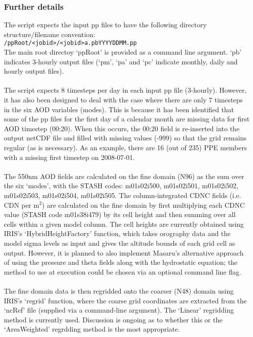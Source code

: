 \documentclass[10pt,a4paper]{article}
\newcommand\tab[1][0.5cm]{\hspace*{#1}}
\begin{document}
\subsubsection{Further details}
The script expects the input pp files to have the following directory structure/filename convention:\\
\tab \texttt{/ppRoot/<jobid>/<jobid>a.pbYYYYDDMM.pp}\\
The main root directoy `ppRoot' is provided as a command line argument. `pb' indicates 3-hourly output files (`pm', `pa' and `pc' indicate monthly, daily and hourly output files).\\\\
The script expects 8 timesteps per day in each input pp file (3-hourly). However, it has also been designed to deal with the case where there are only 7 timesteps in the six AOD variables (modes). This is because it has been identified that some of the pp files for the first day of a calendar month are missing data for first AOD timestep (00:20). When this occurs, the 00:20 field is re-inserted into the output netCDF file and filled with missing values (-999) so that the grid remains regular (as is necessary). As an example, there are 16 (out of 235) PPE members with a missing first timestep on 2008-07-01.\\\\
The 550nm AOD fields are calculated on the fine domain (N96) as the sum over the six `modes', with the STASH codes: m01s02i500, m01s02i501, m01s02i502, m01s02i503, m01s02i504, m01s02i505. The column-integrated CDNC fields (i.e. CDN per m$^2$) are calculated on the fine domain by first multiplying each CDNC value (STASH code m01s38i479) by its cell height and then summing over all cells within a given model column. The cell heights are currently obtained using IRIS's `HybridHeightFactory' function, which takes orography data and the model sigma levels as input and gives the altitude bounds of each grid cell as output. However, it is planned to also implement Masaru's alternative approach of using the pressure and theta fields along with the hydrostatic equation; the method to use at execution could be chosen via an optional command line flag.\\\\
The fine domain data is then regridded onto the coarser (N48) domain using IRIS's `regrid' function, where the coarse grid coordinates are extracted from the `ncRef' file (supplied via a command-line argument). The `Linear' regridding method is currently used. Discussion is ongoing as to whether this or the `AreaWeighted' regrdding method is the most appropriate.\\\\
\end{document}

